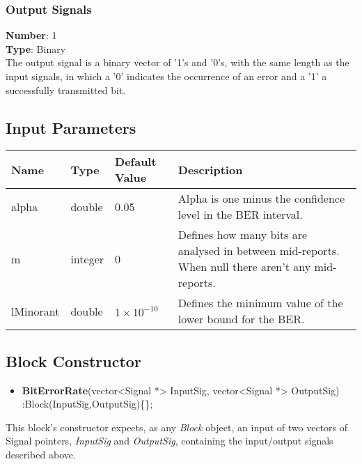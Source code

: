\begin{refsection}
\subsubsection*{Output Signals}
\hspace*{0.5in}\textbf{Number}: 1\\
\hspace*{0.5in}\textbf{Type}: Binary
\\
The output signal is a binary vector of '1's and '0's, with the same length as the input signals, in which a '0' indicates the occurrence of an error and a '1' a successfully transmitted bit.


\subsection*{Input Parameters}

\begin{table}[H]
\centering
\begin{tabular}{|p{1.5cm}|p{1.5cm}|p{1.5cm}|p{7cm}|}
\hline
\textbf{Name}   & \textbf{Type} & \textbf{Default Value}    & \textbf{Description} \\ \hline
alpha           & double        & 0.05                      & Alpha is one minus the confidence level in the BER interval. \\ \hline
m               & integer       & 0                         & Defines how many bits are analysed in between mid-reports. When null there aren't any mid-reports. \\ \hline
lMinorant       & double        & $1\times10^{-10}$         & Defines the minimum value of the lower bound for the BER.\\ \hline
\end{tabular}
\end{table}


\subsection*{Block Constructor}

\begin{itemize}
  \item \textbf{BitErrorRate}(vector<Signal *> InputSig, vector<Signal *> OutputSig) :Block(InputSig,OutputSig)\{\};
\end{itemize}
This block's constructor expects, as any \textit{Block} object, an input of two vectors of Signal pointers, \textit{InputSig} and \textit{OutputSig}, containing the input/output signals described above.


\end{refsection}
